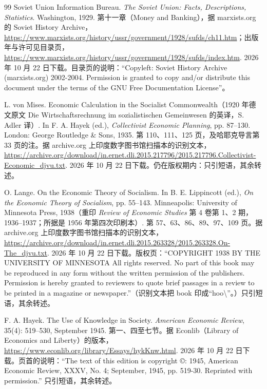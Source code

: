 \begin{thebibliography}{99}
 Soviet Union Information Bureau. \emph{The Soviet Union: Facts, Descriptions, Statistics}. Washington, 1929. 第十一章（Money and Banking），据 marxists.org 的 Soviet History Archive，\url{https://www.marxists.org/history/ussr/government/1928/sufds/ch11.htm}；出版年与许可见目录页，\url{https://www.marxists.org/history/ussr/government/1928/sufds/index.htm}. 2026 年 10 月 22 日下载。目录页的说明：“Copyleft: Soviet History Archive (marxists.org) 2002-2004. Permission is granted to copy and/or distribute this document under the terms of the GNU Free Documentation License”。

 L. von Mises. Economic Calculation in the Socialist Commonwealth（1920 年德文原文 Die Wirtschaftsrechnung im sozialistischen Gemeinwesen 的英译，S. Adler 译）. In F. A. Hayek (ed.), \emph{Collectivist Economic Planning}, pp. 87--130. London: George Routledge \& Sons, 1935. 第 110、111、125 页，及哈耶克导言第 33 页的注。据 archive.org 上印度数字图书馆扫描本的识别文本，\url{https://archive.org/download/in.ernet.dli.2015.217796/2015.217796.Collectivist-Economic_djvu.txt}. 2026 年 10 月 22 日下载。仍在版权期内：只引短语，其余转述。

 O. Lange. On the Economic Theory of Socialism. In B. E. Lippincott (ed.), \emph{On the Economic Theory of Socialism}, pp. 55--143. Minneapolis: University of Minnesota Press, 1938（重印 \emph{Review of Economic Studies} 第 4 卷第 1、2 期，1936--1937；所据是 1956 年第四次印刷本）. 第 57、63、86、89、97、109 页。据 archive.org 上印度数字图书馆扫描本的识别文本，\url{https://archive.org/download/in.ernet.dli.2015.263328/2015.263328.On-The_djvu.txt}. 2026 年 10 月 22 日下载。版权页：“COPYRIGHT 1938 BY THE UNIVERSITY OF MINNESOTA All rights reserved. No part of this book may be reproduced in any form without the written permission of the publishers. Permission is hereby granted to reviewers to quote brief passages in a review to be printed in a magazine or newspaper.”（识别文本把 book 印成“hoo\textbackslash{}”。）只引短语，其余转述。

 F. A. Hayek. The Use of Knowledge in Society. \emph{American Economic Review}, 35(4): 519--530, September 1945. 第一、四至七节。据 Econlib（Library of Economics and Liberty）的版本，\url{https://www.econlib.org/library/Essays/hykKnw.html}. 2026 年 10 月 22 日下载。页首的说明：“The text of this edition is copyright ©: 1945, American Economic Review, XXXV, No. 4; September, 1945, pp. 519-30. Reprinted with permission.” 只引短语，其余转述。


\end{thebibliography}
